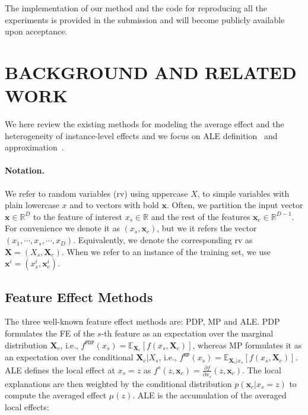 \documentclass[twoside]{article}
\newcommand{\xc}{\mathbf{x}_c}
\newcommand{\xb}{\mathbf{x}}
\begin{document}
The implementation of our method and the code for
reproducing all the experiments is provided in the submission and will
become publicly available upon acceptance.

\section{BACKGROUND AND RELATED WORK}

We here review the existing methods for modeling the average effect
and the heterogeneity of instance-level effects and we focus on ALE
definition~\citep{apley2020visualizing} and
approximation~\citep{apley2020visualizing, gkolemis22}.

\paragraph{Notation.} We refer to random variables (rv) using
uppercase \( X \), to simple variables with plain lowercase \( x \)
and to vectors with bold \( \xb \). Often, we partition the input
vector \(\xb \in \mathbb{R}^D\) to the feature of interest
\(x_s \in \mathbb{R} \) and the rest of the features
\(\xc \in \mathbb{R}^{D-1}\). For convenience we denote it as
\((x_s, \mathbf{x}_c)\), but we it refers the vector
\((x_1, \cdots , x_s, \cdots, x_D)\). Equivalently, we denote the
corresponding rv as \(\mathbf{X} = (X_s, \mathbf{X}_c)\). When we
refer to an instance of the training set, we use
\(\xb^i= (x_s^i, \xc^i) \).


\subsection{Feature Effect Methods}
\label{sec:feat-effect-meth}

The three well-known feature effect methods are: PDP, MP and ALE. PDP
formulates the FE of the \(s\)-th feature as an expectation over the
marginal distribution \(\mathbf{X}_c\), i.e.,
\(f^{\mathtt{PDP}}(x_s) =
\mathbb{E}_{\mathbf{X}_c}[f(x_s,\mathbf{X}_c)]\), whereas MP
formulates it as an expectation over the conditional
\(\mathbf{X}_c|X_s\), i.e.,
\(f^{\mathtt{MP}}(x_s) = \mathbb{E}_{\mathbf{X}_c|x_s}[f(x_s,
\mathbf{X}_c)]\). ALE defines the local effect at \(x_s = z\) as
\(f^s(z, \xc) = \frac{\partial f}{\partial x_s} (z, \xc)\). The local
explanations are then weighted by the conditional distribution
\(p(\xc|x_s=z)\) to compute the averaged effect \(\mu(z)\). ALE is the
accumulation of the averaged local effects:
\end{document}
